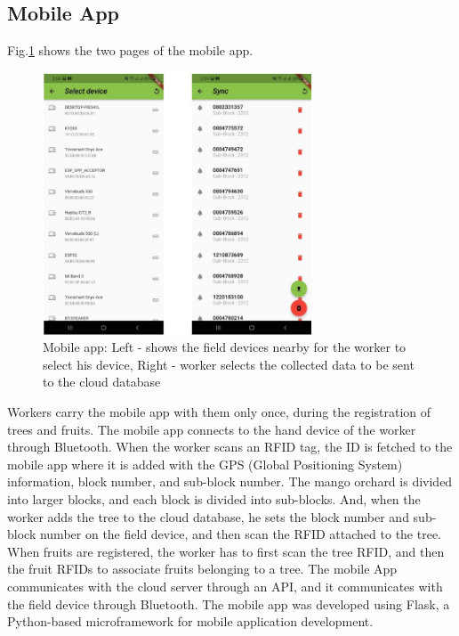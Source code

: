 \documentclass[journal]{IEEEtran}
\begin{document}
\subsection{Mobile App}
Fig.\ref{fig_app} shows the two pages of the mobile app.
\begin{figure}[htb]
	\centering
	\includegraphics[width = 8cm]{graphics/app.png}
	\caption{Mobile app: Left - shows the field devices nearby for the worker to select his device, Right - worker selects the collected data to be sent to the cloud database}
	\label{fig_app}
\end{figure}
Workers carry the mobile app with them only once, during the registration of trees and fruits. The mobile app connects to the hand device of the worker through Bluetooth. When the worker scans an RFID tag, the ID is fetched to the mobile app where it is added with the GPS (Global Positioning System) information, block number, and sub-block number. The mango orchard is divided into larger blocks, and each block is divided into sub-blocks.
And, when the worker adds the tree to the cloud database, he sets the block number and sub-block number on the field device, and then scan the RFID attached to the tree. When fruits are registered, the worker has to first scan the tree RFID, and then the fruit RFIDs to associate fruits belonging to a tree. The mobile App communicates with the cloud server through an API, and it communicates with the field device through Bluetooth. The mobile app was developed using Flask, a Python-based microframework for mobile application development.
\end{document}
